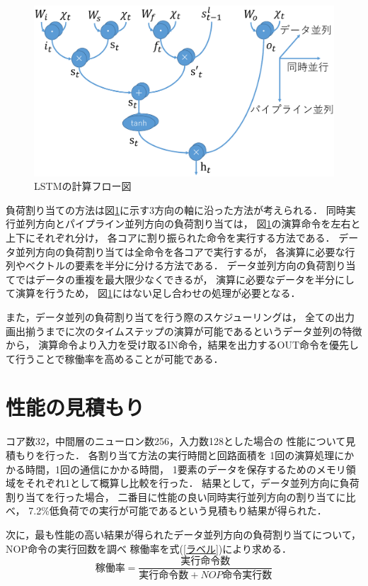 \documentclass[a4j]{jarticle}
\begin{document}
\begin{Abstract}
 \begin{figure}[h]
  \centering
  \includegraphics[scale=0.25]{flow.eps}
  \caption{LSTMの計算フロー図}
  \label{フロー図}
 \end{figure}
負荷割り当ての方法は図\ref{フロー図}に示す3方向の軸に沿った方法が考えられる．
同時実行並列方向とパイプライン並列方向の負荷割り当ては，
図\ref{フロー図}の演算命令を左右と上下にそれぞれ分け，
各コアに割り振られた命令を実行する方法である．
データ並列方向の負荷割り当ては全命令を各コアで実行するが，
各演算に必要な行列やベクトルの要素を半分に分ける方法である．
データ並列方向の負荷割り当てではデータの重複を最大限少なくできるが，
演算に必要なデータを半分にして演算を行うため，
図\ref{フロー図}にはない足し合わせの処理が必要となる．

また，データ並列の負荷割り当てを行う際のスケジューリングは，
全ての出力画出揃うまでに次のタイムステップの演算が可能であるというデータ並列の特徴から，
演算命令より入力を受け取るIN命令，結果を出力するOUT命令を優先して行うことで稼働率を高めることが可能である．

 \section{性能の見積もり}
 コア数32，中間層のニューロン数256，入力数128とした場合の
 性能について見積もりを行った．
 各割り当て方法の実行時間と回路面積を
 1回の演算処理にかかる時間，1回の通信にかかる時間，
 1要素のデータを保存するためのメモリ領域をそれぞれ1として概算し比較を行った．
 結果として，データ並列方向に負荷割り当てを行った場合，
 二番目に性能の良い同時実行並列方向の割り当てに比べ，
 7.2\%低負荷での実行が可能であるという見積もり結果が得られた．

次に，最も性能の高い結果が得られたデータ並列方向の負荷割り当てについて，
NOP命令の実行回数を調べ
稼働率を式(\ref{ラベル})により求める．
\begin{equation}
  稼働率 = \frac{実行命令数}{実行命令数+NOP命令実行数}
  \label{ラベル}
\end{equation}


\end{Abstract}
\end{document}
